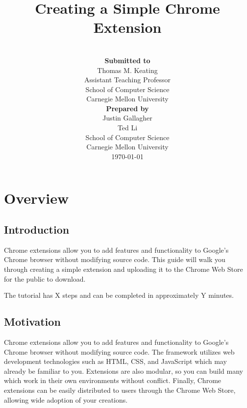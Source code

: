 \documentclass[11pt]{article}
\title{Creating a Simple Chrome Extension\\ \vspace*{.5em} \Large\mytitle}
\date{}
\newcommand{\myname}{Justin Gallagher, Ted Li}
\begin{document}
\author{~\\
\normalsize {\bf Submitted to}\\
\normalsize Thomas M. Keating\\
\normalsize Assistant Teaching Professor\\
\normalsize School of Computer Science\\
\normalsize Carnegie Mellon University\vspace*{2em}\\
\normalsize {\bf Prepared by}\\
\normalsize Justin Gallagher\\
\normalsize Ted Li\vspace*{2em}\\
\normalsize School of Computer Science\\
\normalsize Carnegie Mellon University\\
\normalsize \today}

\clearpage\maketitle
\thispagestyle{firststyle}

\newpage
\lhead{\myname}
\rhead{\thepage}
\setlength{\headsep}{25pt}
\tableofcontents
\newpage
{} 
\setlength{\voffset}{-50pt}
\setlength{\headsep}{25pt}

\section{Overview}

\subsection{Introduction}

Chrome extensions allow you to add features and functionality to Google's Chrome browser without modifying source code. This guide will walk you through creating a simple extension and uploading it to the Chrome Web Store for the public to download.

The tutorial has X steps and can be completed in approximately Y minutes.

\subsection{Motivation}

Chrome extensions allow you to add features and functionality to Google's Chrome browser without modifying source code. The framework utilizes web development technologies such as HTML, CSS, and JavaScript which may already be familiar to you. Extensions are also modular, so you can build many which work in their own environments without conflict. Finally, Chrome extensions can be easily distributed to users through the Chrome Web Store, allowing wide adoption of your creations.
\end{document}
